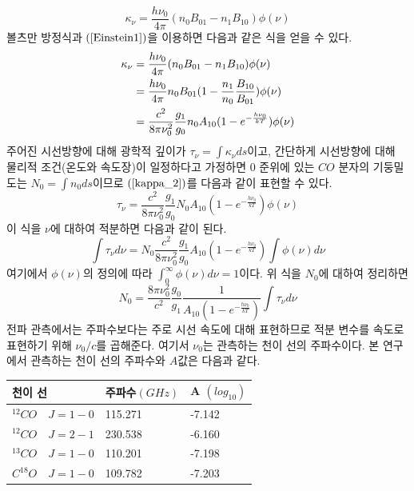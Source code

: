 \begin{equation}
\kappa_\nu = \frac{h \nu_0}{4\pi} (n_0B_{01} - n_1 B_{10}) \phi(\nu)
\end{equation}
볼츠만 방정식과 $(\ref{Einstein1})$을 이용하면 다음과 같은 식을 얻을 수 있다. 
\begin{align}
	\kappa_\nu &= \frac{h \nu_0}{4\pi} (n_0B_{01} - n_1 B_{10}) \phi(\nu) \label{kappa_2} \notag \\
	&= \frac{h \nu_0}{4\pi} n_0B_{01} (1-\frac{n_1}{n_0}\frac{B_{10}}{B_{01}}) \phi(\nu) \notag \\
	&= \frac{c^2}{8\pi \nu_0 ^2} \frac{g_1}{g_0}n_0A_{10} (1-e^{-\frac{h\nu_0}{kT}})\phi(\nu) 
\end{align}
주어진 시선방향에 대해 광학적 깊이가 $\tau_{\nu} = \int \kappa_\nu ds$이고, 간단하게 시선방향에 대해 물리적 조건(온도와 속도장)이 일정하다고 가정하면 0 준위에 있는 $CO$ 분자의 기둥밀도는 $N_0=\int n_0 ds$이므로 $(\ref{kappa_2})$를 다음과 같이 표현할 수 있다. 
\begin{equation}
\tau_\nu = \frac{c^2}{8\pi \nu_0 ^2}\frac{g_1}{g_0}N_0A_{10} (1-e^{-\frac{h\nu_0}{kT}})\phi(\nu)
\end{equation}
이 식을 $\nu$에 대하여 적분하면 다음과 같이 된다.
\begin{equation*}
	\int \tau_\nu d\nu = N_0\frac{c^2}{8\pi \nu_0^2}\frac{g_1}{g_0}A_{10} (1-e^{-\frac{h\nu_0}{kT}})\int \phi(\nu) d\nu
\end{equation*}
여기에서 $\phi(\nu)$의 정의에 따라 $\int_{0}^{\infty} \phi(\nu) d\nu = 1$이다. 위 식을 $N_0$에 대하여 정리하면
\begin{equation}
N_0=  \frac{8\pi \nu_0 ^2}{c^2} \frac{g_0}{g_1} \frac{1}{A_{10}(1-e^{-\frac{h\nu_0}{kT}})}\int \tau_\nu d\nu
\end{equation}
전파 관측에서는 주파수보다는 주로 시선 속도에 대해 표현하므로 적분 변수를 속도로 표현하기 위해 $\nu_0/c$를 곱해준다. 여기서 $\nu_0$는 관측하는 천이 선의 주파수이다. 본 연구에서 관측하는 천이 선의 주파수와 $A$값은 다음과 같다.\\
\begin{center}
	\begin{tabular}{ | l | l  | l |}
		\hline
		천이 선 & 주파수$(GHz)$ & A $(log_{10})$ \\ \hline
		$^{12}CO\quad J=1-0$ & 115.271 & -7.142 \\ \hline
		$^{12}CO\quad J=2-1$ & 230.538 & -6.160 \\ \hline
		$^{13}CO\quad J=1-0$ & 110.201 & -7.198 \\ \hline
		$C^{18}O\quad J=1-0$ & 109.782 & -7.203 \\ \hline
	\end{tabular}
\end{center}
